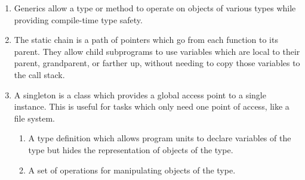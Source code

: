 \documentclass{article}
\begin{document}
\begin{enumerate}
\item Generics allow a type or method to operate on objects of various types while providing compile-time type safety.
\item The static chain is a path of pointers which go from each function to its parent. They allow child subprograms to use variables which are local to their parent, grandparent, or farther up, without needing to copy those variables to the call stack.
\item A singleton is a class which provides a global access point to a single instance. This is useful for tasks which only need one point of access, like a file system.
\begin{enumerate}
The two pieces are:
\item A type definition which allows program units to declare variables of the type but hides the representation of objects of the type.
\item A set of operations for manipulating objects of the type.
\end{enumerate}

  \end{enumerate}
\end{document}
